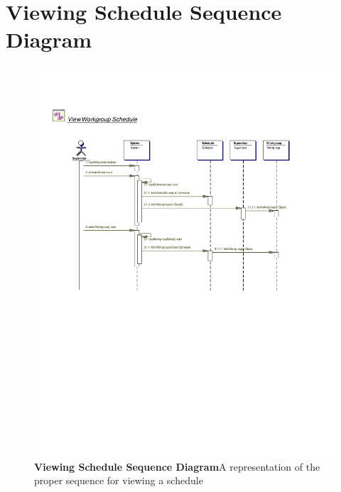 \documentclass[letterpaper,12pt]{report}
\begin{document}
\section{Viewing Schedule Sequence Diagram}
\begin{figure}[hbp]
 \includegraphics[trim=20mm 90mm 25mm 35mm]{diagrams/seq3.pdf}
 \caption{\small
\textbf{Viewing Schedule Sequence Diagram}\newline A representation of the proper sequence for viewing a schedule}\label{fig:seq3}
\end{figure}
\newpage
\end{document}
